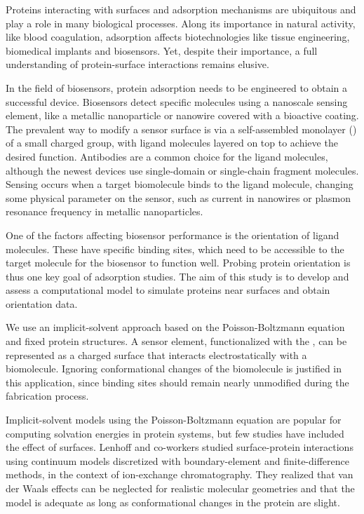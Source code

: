
Proteins interacting with surfaces and adsorption mechanisms are ubiquitous and play a role in many biological processes. 
Along its importance in natural activity, like blood coagulation, adsorption affects biotechnologies like tissue engineering, biomedical implants and biosensors.
Yet, despite their importance, a full understanding of protein-surface interactions remains elusive.\cite{Gray2004,RabeVerdesSeegel2011}

In the field of biosensors, protein adsorption needs to be engineered to obtain a successful device. 
Biosensors detect specific molecules using a nanoscale sensing element, like a metallic nanoparticle or nanowire covered with a bioactive coating. 
The prevalent way to modify a sensor surface is via a self-assembled monolayer (\sam) of a small charged group, with ligand molecules layered on top to achieve the desired function. 
Antibodies are a common choice for the ligand molecules, although the newest devices use single-domain or single-chain fragment molecules.\cite{ByunETal2013,TrillingETal2014} 
Sensing occurs when a target biomolecule binds to the ligand molecule,  changing some physical parameter on the sensor, such as current in nanowires or plasmon resonance frequency in metallic nanoparticles. 

One of the factors affecting biosensor performance is the orientation of ligand molecules.\cite{TajimaTakaiIshihara2011,TrillingBeekwilderZuilhof2013} 
These have specific binding sites, which need to be accessible to the target molecule for the biosensor to function well.
Probing protein orientation is thus one key goal of adsorption studies.
The aim of this study is to develop and assess a computational model to simulate proteins near surfaces and obtain orientation data.

We use an implicit-solvent approach based on the Poisson-Boltzmann equation and fixed protein structures. A sensor element, functionalized with the \sam, can be represented as a charged surface that interacts electrostatically with a biomolecule. Ignoring conformational changes of the biomolecule is justified in this application, since binding sites should remain nearly unmodified during the fabrication process.\cite{TajimaTakaiIshihara2011} 


Implicit-solvent models using the Poisson-Boltzmann equation are popular for computing solvation energies in protein systems,\cite{RouxSimonson1999,Bardhan2012} but few studies have included the effect of surfaces. Lenhoff and co-workers studied surface-protein interactions using continuum models discretized with boundary-element\cite{YoonLenhoff1992,RothLenhoff1993,AsthagiriLenhoff1997} and finite-difference methods,\cite{YaoLenhoff2004,YaoLenhoff2005} in the context of ion-exchange chromatography. They realized that van der Waals effects can be neglected for realistic molecular geometries\cite{RothNealLenhoff1996} and that the model is adequate as long as conformational changes in the protein are slight.\cite{YaoLenhoff2004,YaoLenhoff2005} 

